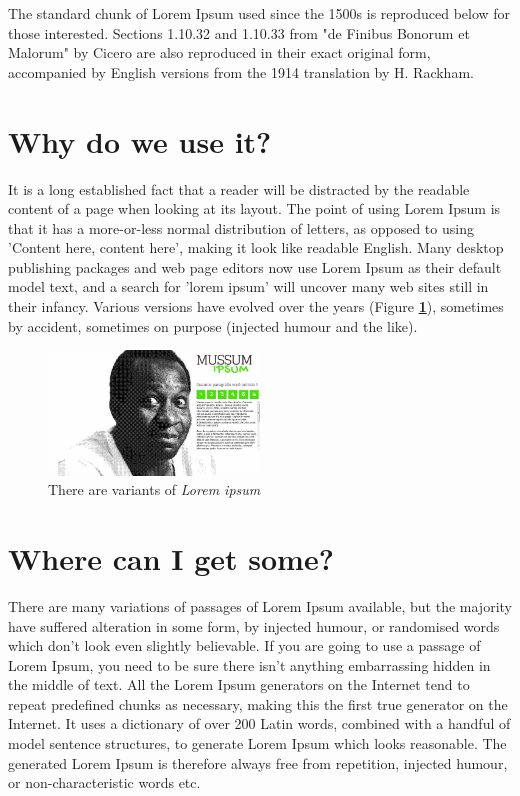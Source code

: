 \documentclass[12pt]{article}
\newcommand{\visible}[1]{\textbf{\textcolor{blue}{#1}}} %
\begin{document}
\begin{multicols}{2}
The standard chunk of Lorem Ipsum used since the 1500s is reproduced below for those interested. Sections 1.10.32 and 1.10.33 from "de Finibus Bonorum et Malorum" by Cicero are also reproduced in their exact original form, accompanied by English versions from the 1914 translation by H. Rackham.

\section{%
Why do we use it?%
}

It is a long established fact that a reader will be distracted by the readable content of a page when looking at its layout. The point of using Lorem Ipsum is that it has a more-or-less normal distribution of letters, as opposed to using 'Content here, content here', making it look like readable English. Many desktop publishing packages and web page editors now use Lorem Ipsum as their default model text, and a search for 'lorem ipsum' will uncover many web sites still in their infancy. Various versions have evolved over the years (Figure \visible{\ref{fig:mussum}}), sometimes by accident, sometimes on purpose (injected humour and the like).

\end{multicols}

\begin{figure}
    \begin{center}
    \includegraphics[width=0.5\textwidth]{mussum}
    \end{center}
    \caption{There are variants of \textit{Lorem ipsum}\centering}
    \label{fig:mussum}
\end{figure}\leavevmode

\section{Where can I get some?}
There are many variations of passages of Lorem Ipsum available, but the majority have suffered alteration in some form, by injected humour, or randomised words which don't look even slightly believable. If you are going to use a passage of Lorem Ipsum, you need to be sure there isn't anything embarrassing hidden in the middle of text. All the Lorem Ipsum generators on the Internet tend to repeat predefined chunks as necessary, making this the first true generator on the Internet. It uses a dictionary of over 200 Latin words, combined with a handful of model sentence structures, to generate Lorem Ipsum which looks reasonable. The generated Lorem Ipsum is therefore always free from repetition, injected humour, or non-characteristic words etc.
\end{document}

